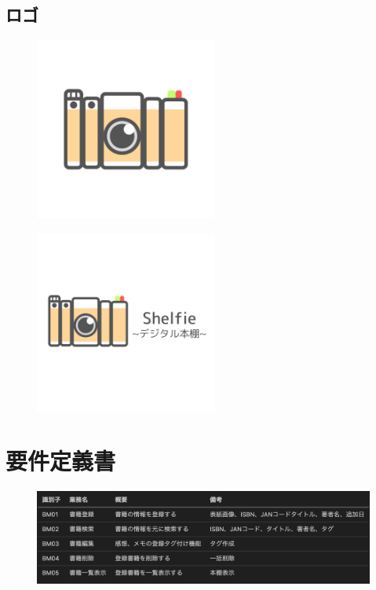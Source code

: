 \documentclass[a4paper, 11pt, titlepage]{jsarticle}
\begin{document}
\clearpage

\subsection{ロゴ}
\begin{figure}[htbp]
\centering
\includegraphics[width=60mm] {shelfie_logo.png}
\label{fig:func}
\end{figure}

\begin{figure}[htbp]
\centering
\includegraphics[width=60mm] {shelfie_logo2.png}
\label{fig:func}
\end{figure}

\clearpage

\section{要件定義書}%
\begin{figure}[htbp]
\centering
\includegraphics[width=120mm]{work.png}
\label{fig:func}
\end{figure}
\end{document}

